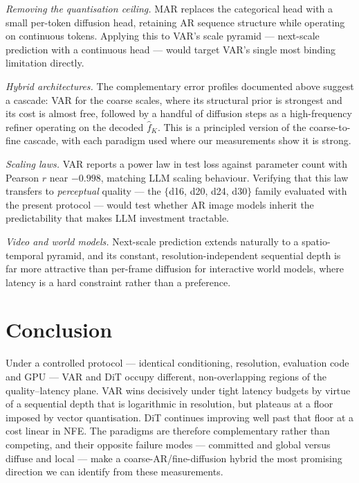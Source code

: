 \documentclass[conference]{IEEEtran}
\begin{document}
\emph{Removing the quantisation ceiling.} MAR \cite{li2024mar} replaces the categorical
head with a small per-token diffusion head, retaining AR sequence structure while operating
on continuous tokens. Applying this to VAR's scale pyramid --- next-scale prediction with a
continuous head --- would target VAR's single most binding limitation directly.

\emph{Hybrid architectures.} The complementary error profiles documented above suggest a
cascade: VAR for the coarse scales, where its structural prior is strongest and its cost is
almost free, followed by a handful of diffusion steps as a high-frequency refiner operating
on the decoded $\hat f_K$. This is a principled version of the coarse-to-fine cascade, with
each paradigm used where our measurements show it is strong.

\emph{Scaling laws.} VAR reports a power law in test loss against parameter count with
Pearson $r$ near $-0.998$, matching LLM scaling behaviour. Verifying that this law transfers
to \emph{perceptual} quality --- the $\{$d16, d20, d24, d30$\}$ family evaluated with the
present protocol --- would test whether AR image models inherit the predictability that
makes LLM investment tractable.

\emph{Video and world models.} Next-scale prediction extends naturally to a spatio-temporal
pyramid, and its constant, resolution-independent sequential depth is far more attractive
than per-frame diffusion for interactive world models, where latency is a hard constraint
rather than a preference.

\section{Conclusion}

Under a controlled protocol --- identical conditioning, resolution, evaluation code and
GPU --- VAR and DiT occupy different, non-overlapping regions of the quality--latency
plane. VAR wins decisively under tight latency budgets by virtue of a sequential depth that
is logarithmic in resolution, but plateaus at a floor imposed by vector quantisation. DiT
continues improving well past that floor at a cost linear in NFE. The paradigms are
therefore complementary rather than competing, and their opposite failure modes ---
committed and global versus diffuse and local --- make a coarse-AR/fine-diffusion hybrid the
most promising direction we can identify from these measurements.
\end{document}
